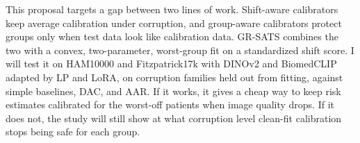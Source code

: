 \documentclass[sigconf,nonacm]{acmart}
\begin{document}
This proposal targets a gap between two lines of work. Shift-aware calibrators keep average calibration under corruption, and group-aware calibrators protect groups only when test data look like calibration data. GR-SATS combines the two with a convex, two-parameter, worst-group fit on a standardized shift score. I will test it on HAM10000 and Fitzpatrick17k with DINOv2 and BiomedCLIP adapted by LP and LoRA, on corruption families held out from fitting, against simple baselines, DAC, and AAR. If it works, it gives a cheap way to keep risk estimates calibrated for the worst-off patients when image quality drops. If it does not, the study will still show at what corruption level clean-fit calibration stops being safe for each group.



\end{document}
